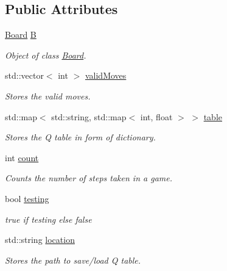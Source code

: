 \subsection*{Public Attributes}
\begin{DoxyCompactItemize}
\item 
\mbox{\label{classQLearning_a27b6176321609459df788781231101d5}} 
\mbox{\hyperlink{classBoard}{Board}} \mbox{\hyperlink{classQLearning_a27b6176321609459df788781231101d5}{B}}
\begin{DoxyCompactList}\small\item\em Object of class \mbox{\hyperlink{classBoard}{Board}}. \end{DoxyCompactList}\item 
\mbox{\label{classQLearning_a450546979def478cd68a509c0bb0f864}} 
std\+::vector$<$ int $>$ \mbox{\hyperlink{classQLearning_a450546979def478cd68a509c0bb0f864}{valid\+Moves}}
\begin{DoxyCompactList}\small\item\em Stores the valid moves. \end{DoxyCompactList}\item 
\mbox{\label{classQLearning_a2c6388cfcc08157a313a21aa11eea620}} 
std\+::map$<$ std\+::string, std\+::map$<$ int, float $>$ $>$ \mbox{\hyperlink{classQLearning_a2c6388cfcc08157a313a21aa11eea620}{table}}
\begin{DoxyCompactList}\small\item\em Stores the Q table in form of dictionary. \end{DoxyCompactList}\item 
\mbox{\label{classQLearning_abb393197ddcd0739578d72a10244ed65}} 
int \mbox{\hyperlink{classQLearning_abb393197ddcd0739578d72a10244ed65}{count}}
\begin{DoxyCompactList}\small\item\em Counts the number of steps taken in a game. \end{DoxyCompactList}\item 
\mbox{\label{classQLearning_acfd795afa29218157ee8960193c556ff}} 
bool \mbox{\hyperlink{classQLearning_acfd795afa29218157ee8960193c556ff}{testing}}
\begin{DoxyCompactList}\small\item\em true if testing else false \end{DoxyCompactList}\item 
\mbox{\label{classQLearning_a096f0c622c3d41270d0291613f9c64b9}} 
std\+::string \mbox{\hyperlink{classQLearning_a096f0c622c3d41270d0291613f9c64b9}{location}}
\begin{DoxyCompactList}\small\item\em Stores the path to save/load Q table. \end{DoxyCompactList}\end{DoxyCompactItemize}


